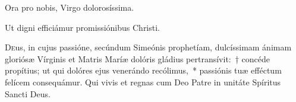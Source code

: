 \documentclass[vesperale_romanum.tex]{subfiles}
\begin{document}
\hymnus


\vv Ora pro nobis, Virgo dolorosíssima.

\rr Ut digni efficiámur promissiónibus Christi.

\admagnificat


\oratio

\lettrine{D}{e}us, in cujus passióne, secúndum Simeónis prophetíam, dulcíssimam ánimam gloriósæ Vírginis et Matris Maríæ dolóris gládius pertransívit:~† concéde propítius; ut qui dolóres ejus venerándo recólimus,~* passiónis tuæ effé\-ctum felícem consequámur. Qui vivis et regnas cum Deo Patre in unitáte Spíritus Sancti Deus.

\commferiae





\omniapraeter

\admagnificat


\commferiae


\end{document}
